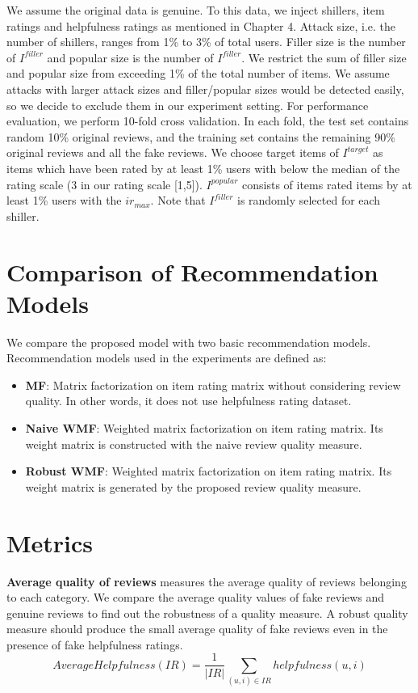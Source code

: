 \documentclass[master,english,final]{kaist-ucs}
\begin{document}
We assume the original data is genuine.
To this data, we inject shillers, item ratings and helpfulness ratings as mentioned in Chapter 4.
Attack size, i.e. the number of shillers, ranges from 1\% to 3\% of total users.
Filler size is the number of $I^{filler}$ and popular size is the number of $I^{filler}$.
We restrict the sum of filler size and popular size from exceeding 1\% of the total number of items.
We assume attacks with larger attack sizes and filler/popular sizes would be detected easily, so we decide to exclude them in our experiment setting.
For performance evaluation, we perform 10-fold cross validation.
In each fold, the test set contains random 10\% original reviews, and the training set contains the remaining 90\% original reviews and all the fake reviews.
We choose target items of $I^{target}$ as items which have been rated by at least 1\% users with below the median of the rating scale (3 in our rating scale [1,5]).
$I^{popular}$ consists of items rated items by at least 1\% users with the $ir_{max}$.
Note that $I^{filler}$ is randomly selected for each shiller.

\section{Comparison of Recommendation Models}
We compare the proposed model with two basic recommendation models.
Recommendation models used in the experiments are defined as:
\begin{itemize}
\item \textbf{MF}: Matrix factorization on item rating matrix without considering review quality. In other words, it does not use helpfulness rating dataset.
\item \textbf{Naive WMF}: Weighted matrix factorization on item rating matrix. Its weight matrix is constructed with the naive review quality measure.
\item \textbf{Robust WMF}: Weighted matrix factorization on item rating matrix. Its weight matrix is generated by the proposed review quality measure.
\end{itemize}

\section{Metrics}
\textbf{Average quality of reviews} measures the average quality of reviews belonging to each category.
We compare the average quality values of fake reviews and genuine reviews to find out the robustness of a quality measure.
A robust quality measure should produce the small average quality of fake reviews even in the presence of fake helpfulness ratings.
\begin{equation}
AverageHelpfulness(IR) = \frac{1}{|IR|} \sum_{ (u,i) \in IR } helpfulness(u,i)
\end{equation}
\end{document}
